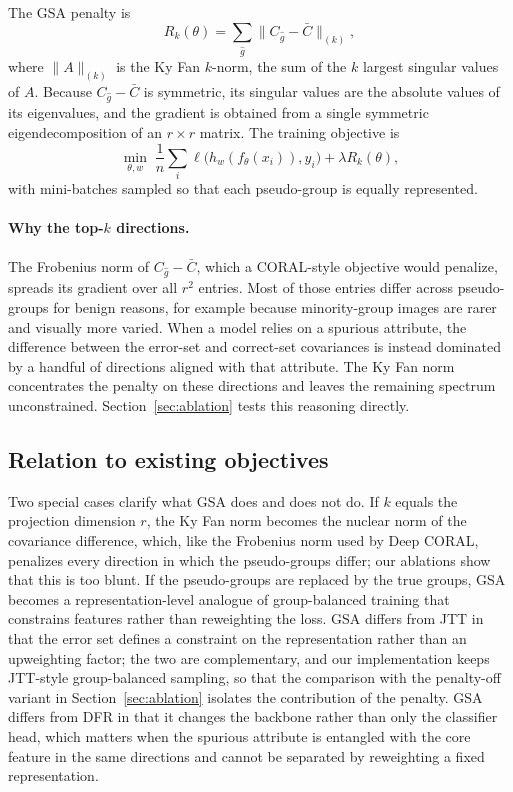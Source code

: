 \documentclass{article}
\begin{document}
The GSA penalty is
\begin{equation}
R_k(\theta) = \sum_{\hat g} \big\| C_{\hat g} - \bar C \big\|_{(k)},
\end{equation}
where $\|A\|_{(k)}$ is the Ky Fan $k$-norm, the sum of the $k$ largest singular values of $A$. Because $C_{\hat g} - \bar C$ is symmetric, its singular values are the absolute values of its eigenvalues, and the gradient is obtained from a single symmetric eigendecomposition of an $r \times r$ matrix. The training objective is
\begin{equation}
\min_{\theta, w} \; \frac{1}{n} \sum_{i} \ell\big(h_w(f_\theta(x_i)), y_i\big) + \lambda R_k(\theta),
\end{equation}
with mini-batches sampled so that each pseudo-group is equally represented.

\paragraph{Why the top-$k$ directions.}
The Frobenius norm of $C_{\hat g} - \bar C$, which a CORAL-style objective would penalize, spreads its gradient over all $r^2$ entries. Most of those entries differ across pseudo-groups for benign reasons, for example because minority-group images are rarer and visually more varied. When a model relies on a spurious attribute, the difference between the error-set and correct-set covariances is instead dominated by a handful of directions aligned with that attribute. The Ky Fan norm concentrates the penalty on these directions and leaves the remaining spectrum unconstrained. Section~\ref{sec:ablation} tests this reasoning directly.

\subsection{Relation to existing objectives}
Two special cases clarify what GSA does and does not do. If $k$ equals the projection dimension $r$, the Ky Fan norm becomes the nuclear norm of the covariance difference, which, like the Frobenius norm used by Deep CORAL, penalizes every direction in which the pseudo-groups differ; our ablations show that this is too blunt. If the pseudo-groups are replaced by the true groups, GSA becomes a representation-level analogue of group-balanced training that constrains features rather than reweighting the loss. GSA differs from JTT in that the error set defines a constraint on the representation rather than an upweighting factor; the two are complementary, and our implementation keeps JTT-style group-balanced sampling, so that the comparison with the penalty-off variant in Section~\ref{sec:ablation} isolates the contribution of the penalty. GSA differs from DFR in that it changes the backbone rather than only the classifier head, which matters when the spurious attribute is entangled with the core feature in the same directions and cannot be separated by reweighting a fixed representation.
\end{document}
